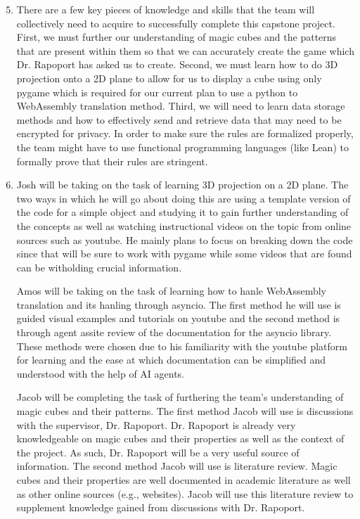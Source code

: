 \documentclass[12pt]{article}
\begin{document}
\begin{enumerate}
  \setcounter{enumi}{4}
  \item There are a few key pieces of knowledge and skills that the team will collectively need to acquire to
  successfully complete this capstone project. First, we must further our understanding of
  magic cubes and the patterns that are present within them so that we can accurately 
  create the game which Dr. Rapoport has asked us to create. Second, we must learn how to do 3D projection
  onto a 2D plane to allow for us to display a cube using only pygame which is required for our 
  current plan to use a python to WebAssembly translation method. Third, we will need to learn data 
  storage methods and how to effectively send and retrieve data that may need to be encrypted
  for privacy. In order to make sure the rules are formalized properly, the team might have to use 
  functional programming languages (like Lean) to formally prove that their rules are stringent. 
  \item Josh will be taking on the task of learning 3D projection on a 2D plane. The two ways in which he will
  go about doing this are using a template version of the code for a simple object and studying it to gain
  further understanding of the concepts as well as watching instructional videos on the topic from online sources
  such as youtube. He mainly plans to focus on breaking down the code since that will be sure to work with pygame while
  some videos that are found can be witholding crucial information.

  Amos will be taking on the task of learning how to hanle WebAssembly translation and its hanling through asyncio. The first method he will use is guided visual examples and tutorials on youtube and the second method is through agent assite review of the documentation for the asyncio library. These methods were chosen due to his familiarity with the youtube platform for learning and the ease at which documentation can be simplified and understood with the help of AI agents.

  Jacob will be completing the task of furthering the team's understanding of magic cubes and their patterns. The first method Jacob will use is discussions with the supervisor, Dr. Rapoport. Dr. Rapoport is already very knowledgeable on magic cubes and their properties as well as the context of the project. As such, Dr. Rapoport will be a very useful source of information. The second method Jacob will use is literature review. Magic cubes and their properties are well documented in academic literature as well as other online sources (e.g., websites). Jacob will use this literature review to supplement knowledge gained from discussions with Dr. Rapoport.


\end{enumerate}
\end{document}
